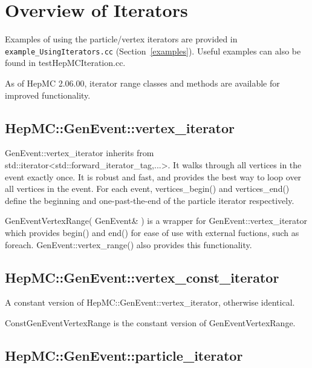 \documentclass[11pt,letterpaper]{article}
\begin{document}
%
%

\section{Overview of Iterators}
\label{iterators}

Examples of using the particle/vertex iterators are provided in
\verb!example_UsingIterators.cc! (Section~\ref{examples}).  
Useful examples can also be found in testHepMCIteration.cc.

As of HepMC 2.06.00, iterator range classes and methods are 
available for improved functionality.

%
%

\subsection{HepMC::GenEvent::vertex\_iterator}

GenEvent::vertex\_iterator inherits from 
std::iterator<std::forward\_iterator\_tag,...>. 
It walks through all vertices in the event exactly once. It is robust and
fast, and provides the best way to loop over all vertices in the
event. For each event,
vertices\_begin() and vertices\_end() define the beginning and
one-past-the-end of the particle iterator respectively.

GenEventVertexRange( GenEvent\& ) is a wrapper for 
GenEvent::vertex\_iterator which provides begin() and end() for
ease of use with external fuctions, such as foreach.
GenEvent::vertex\_range() also provides this functionality.

%
%

\subsection{HepMC::GenEvent::vertex\_const\_iterator}

A constant version of HepMC::GenEvent::vertex\_iterator, otherwise identical.

ConstGenEventVertexRange is the constant version of GenEventVertexRange.

%
%

\subsection{HepMC::GenEvent::particle\_iterator}
\end{document}

